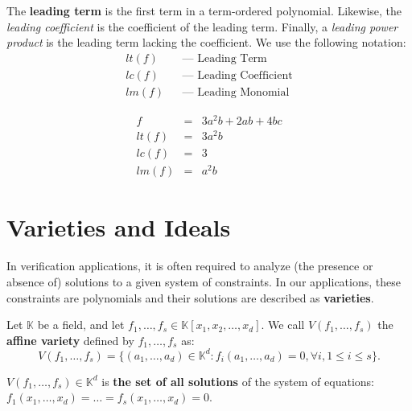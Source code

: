 
\begin{Definition}
The {\bf leading term} is the first term in a term-ordered polynomial.
Likewise, the {\it leading coefficient} is the coefficient of
the leading term.  Finally, a {\it leading power product} is the leading term 
lacking the coefficient.  We use the following notation:
\begin{eqnarray}
     lt(f)&& \text{--- Leading Term} \\
     lc(f)&& \text{--- Leading Coefficient} \\
     lm(f)&& \text{--- Leading Monomial}
\end{eqnarray}
\end{Definition}

\begin{Example}
\begin{eqnarray}
     f      &=& 3a^2b + 2ab + 4bc \\
     lt(f)  &=& 3a^2b \\
     lc(f)  &=& 3 \\
     lm(f)  &=& a^2b
\end{eqnarray}
\end{Example}

\section{Varieties and Ideals}
In verification applications, it is often required to analyze (the presence or absence of) solutions to a given system of constraints.
In our applications, these constraints are polynomials and their solutions are described as {\bf varieties}.

\begin{Definition}
Let $\mathbb{K}$ be a field, and let $f_1, \ldots, f_s \in \mathbb{K}[x_1, x_2, 
\ldots, x_d]$. We call $V(f_1, \dots, f_s)$ the {\bf affine variety} defined by $f_1, \dots, f_s$ as:
\begin{equation}
V(f_1, \ldots, f_s)= \{(a_1, \ldots, a_{d})\in \mathbb{K}^d:f_i(a_1, \ldots, a_d)=0, \forall{i},1\le i \le s\}.
\end{equation}
\end{Definition}

$V(f_1, \dots, f_s)\in \mathbb{K}^d$ is {\bf the set of  all solutions} of the system of equations: 
$f_1(x_1,\ldots,x_d)=\dots=f_s(x_1,\dots,x_d)=0$. 

